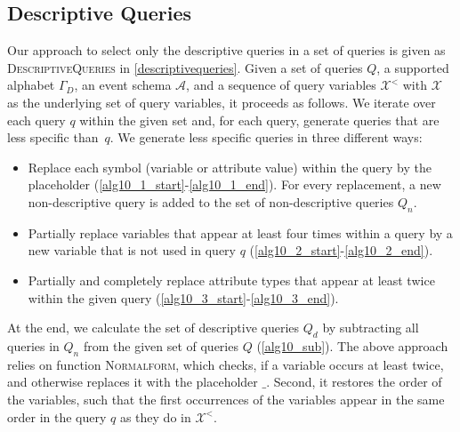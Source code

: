 \subsection{Descriptive Queries}
Our approach to select only the descriptive queries in a set of queries is
given as \textsc{DescriptiveQueries} in \autoref{descriptivequeries}. Given
a set of queries $Q$, a supported alphabet
$\Gamma_D$, an event schema $\mathcal{A}$, and a sequence of query variables
$\mathcal{X}^<$ with $\mathcal{X}$ as the underlying set of query variables,
it proceeds as follows. We iterate over each
query $q$ within the given set and, for each query, generate queries that
are less specific than~$q$.
We generate less specific queries in three different ways:
\begin{itemize}
\item Replace each symbol (variable or attribute value) within the query by
the placeholder (\autoref{alg10_1_start}-\ref{alg10_1_end}). For every
replacement, a new non-descriptive query is added
to the set of non-descriptive queries $Q_n$.
\item Partially replace variables that appear at least four times within a
query by a new variable that is not used in query $q$
(\autoref{alg10_2_start}-\ref{alg10_2_end}).
\item Partially and completely replace attribute types that appear at least
twice within the given query  (\autoref{alg10_3_start}-\ref{alg10_3_end}).
\end{itemize}
At the end, we calculate the set of descriptive queries $Q_d$ by subtracting
all queries in $Q_n$ from the given set of queries $Q$ (\autoref{alg10_sub}).
The above approach relies on function \textsc{Normalform}, which checks, if
a variable occurs
at least twice, and otherwise replaces it with the placeholder $\_$. Second,
it restores the order of the variables, such that the first occurrences of
the variables appear in the same order in the query $q$ as they do in
$\mathcal{X}^<$.

